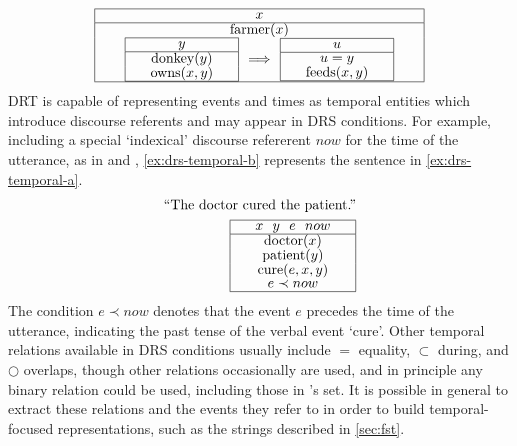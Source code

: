 \documentclass[a4paper,12pt,leqno,twoside]{article}
\def\drs#1#2{
\renewcommand{\arraystretch}{0.8}
\begin{tabular}[c]{|>{\hspace{1pc}}c<{\hspace{1pc}}|}
	\hline #1 \\
	\hline #2 \\
	\hline
\end{tabular}
\renewcommand{\arraystretch}{1}
}
\begin{document}
\begin{align}
	\drs{$x$}{farmer($x$)\\\drs{$y$}{donkey($y$)\\owns($x,y$)} $\Longrightarrow$ \drs{$u$}{$u = y$\\feeds($x,y$)}}\label{ex:donkey-2-drs}
\end{align}
DRT is capable of representing events and times as temporal entities which introduce discourse referents and may appear in DRS conditions. For example, including a special `indexical' discourse refererent $now$ for the time of the utterance, as in \citet[p. 104]{kamp1988discourse} and \citet{abzianidze2017parallel}, \cref{ex:drs-temporal-b} represents the sentence in \cref{ex:drs-temporal-a}.
\begin{subequations}
	\begin{align}
		\text{``The doctor cured the patient.''}\label{ex:drs-temporal-a}\\
		\drs{$x~~y~~e~~now$}{doctor($x$)\\patient($y$)\\cure($e,x,y$)\\$e \prec now$}\label{ex:drs-temporal-b}
	\end{align}
\end{subequations}
The condition $e \prec now$ denotes that the event $e$ precedes the time of the utterance, indicating the past tense of the verbal event `cure'. Other temporal relations available in DRS conditions usually include $=$ equality, $\subset$ during, and $\bigcirc$ overlaps, though other relations occasionally are used, and in principle any binary relation could be used, including those in \citet{allen1983maintaining}'s set. It is possible in general to extract these relations and the events they refer to in order to build temporal-focused representations, such as the strings described in \cref{sec:fst}.
\end{document}
